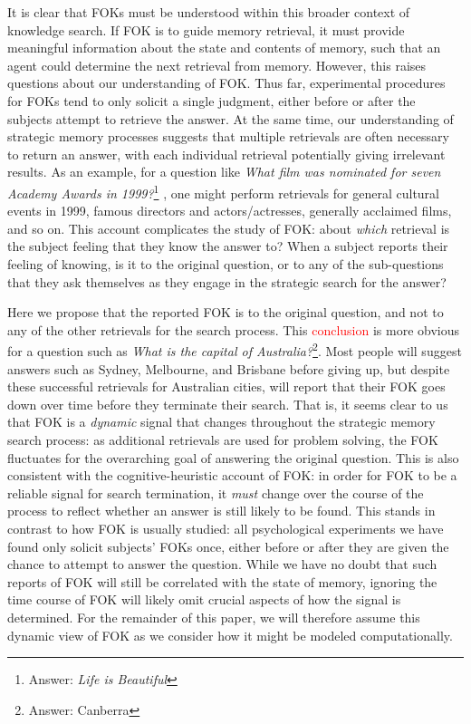\documentclass[10pt,letterpaper]{article}
\newcommand{\fixme}[2][]{#2}
\renewcommand{\fixme}[2][]{\textcolor{red}{#2}}
\newcommand{\question}[2]{\textit{#1}\footnote{Answer: #2}}
\begin{document}
It is clear that FOKs must be understood within this broader context of knowledge search.
If FOK is to guide memory retrieval, it must provide meaningful information about the state and contents of memory, such that an agent could determine the next retrieval from memory. %
However, this raises questions about our understanding of FOK.
Thus far, experimental procedures for FOKs tend to only solicit a single judgment, either before or after the subjects attempt to retrieve the answer.
At the same time, our understanding of strategic memory processes suggests that multiple retrievals are often necessary to return an answer, with each individual retrieval potentially giving irrelevant results. %
As an example, for a question like \question{What film was nominated for seven Academy Awards in 1999?}{\textit{Life is Beautiful}} \cite{Norman2016TheRelationshipBetween}, one might perform retrievals for general cultural events in 1999, famous directors and actors/actresses, generally acclaimed films, and so on.
This account complicates the study of FOK: about \textit{which} retrieval is the subject feeling that they know the answer to?
When a subject reports their feeling of knowing, is it to the original question, or to any of the sub-questions that they ask themselves as they engage in the strategic search for the answer?

Here we propose that the reported FOK is to the original question, and not to any of the other retrievals for the search process.
This \fixme{conclusion} is more obvious for a question such as \question{What is the capital of Australia?}{Canberra}.
Most people will suggest answers such as Sydney, Melbourne, and Brisbane before giving up, but despite these successful retrievals for Australian cities, will report that their FOK goes down over time before they terminate their search.
That is, it seems clear to us that FOK is a \textit{dynamic} signal that changes throughout the strategic memory search process: as additional retrievals are used for problem solving, the FOK fluctuates for the overarching goal of answering the original question.
This is also consistent with the cognitive-heuristic account of FOK: in order for FOK to be a reliable signal for search termination, it \textit{must} change over the course of the process to reflect whether an answer is still likely to be found.
This stands in contrast to how FOK is usually studied: all psychological experiments we have found only solicit subjects' FOKs once, either before or after they are given the chance to attempt to answer the question. %
While we have no doubt that such reports of FOK will still be correlated with the state of memory, ignoring the time course of FOK will likely omit crucial aspects of how the signal is determined.
For the remainder of this paper, we will therefore assume this dynamic view of FOK as we consider how it might be modeled computationally.
\end{document}
